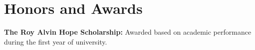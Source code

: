 \documentclass[a4paper,20pt]{article}
\begin{document}
	\section{Honors and Awards}
	\begin{description}[font=$\bullet$]
		\item {\textbf{The Roy Alvin Hope Scholarship:} Awarded based on academic performance during the first year of university.}
	\end{description}
\end{document}
